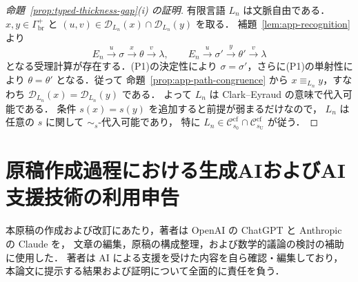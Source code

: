 \documentclass[11pt,a4paper]{ltjsarticle}
\theoremstyle{remark}
\theoremstyle{plain}
\newcommand{\D}{\mathcal{D}}
\newcommand{\cf}{\mathrm{cf}}
\newcommand{\Ccf}[1]{\mathcal C_{#1}^{\cf}}
\begin{document}
\begin{proof}[命題~\ref{prop:typed-thickness-gap}(i) の証明]
有限言語 $L_n$ は文脈自由である．
$x,y\in\Gamma_{\mathrm{br}}^+$ と
$(u,v)\in\D_{L_n}(x)\cap\D_{L_n}(y)$ を取る．
補題~\ref{lem:app-recognition} より
\[
E_n\xrightarrow{u}\sigma\xrightarrow{x}\theta
\xrightarrow{v}\lambda,\qquad
E_n\xrightarrow{u}\sigma'\xrightarrow{y}\theta'
\xrightarrow{v}\lambda
\]
となる受理計算が存在する．(P1)の決定性により
$\sigma=\sigma'$，さらに(P1)の単射性により
$\theta=\theta'$ となる．従って
命題~\ref{prop:app-path-congruence} から
$x\equiv_{L_n}y$，すなわち
$\D_{L_n}(x)=\D_{L_n}(y)$ である．
よって $L_n$ は Clark--Eyraud の意味で代入可能である．
条件 $s(x)=s(y)$ を追加すると前提が弱まるだけなので，
$L_n$ は任意の $s$ に関して $\sim_s$-代入可能であり，
特に $L_n\in\Ccf{s_0}\cap\Ccf{s_{\mathrm U}}$ が従う．
\end{proof}

\section*{原稿作成過程における生成AIおよびAI支援技術の利用申告}
本原稿の作成および改訂にあたり，著者は
OpenAI の ChatGPT と Anthropic の Claude を，
文章の編集，原稿の構成整理，および数学的議論の検討の補助に使用した．
著者は AI による支援を受けた内容を自ら確認・編集しており，
本論文に提示する結果および証明について全面的に責任を負う．
\end{document}
